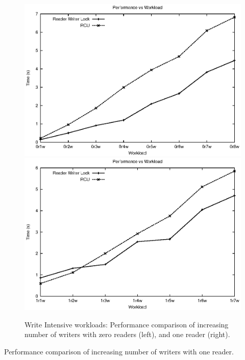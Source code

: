 \documentclass[a4paper]{article}
\begin{document}
\begin{figure}[tph]
\centering
\includegraphics[scale = 0.45]{../images/graphs/micro_0r_vw}
\includegraphics[scale = 0.45]{../images/graphs/micro_1r_vw}
\caption{Write Intensive workloads: Performance comparison of increasing number of writers with zero readers (left), and one reader (right).}
\label{img:micro_01r_vw}
\end{figure}

\begin{table}[tph]
\begin{center}

\end{center}
\label{tbl:micro_1r_vw}
\caption{Performance comparison of increasing number of writers with one reader.}
\end{table}
\pagebreak
\end{document}

